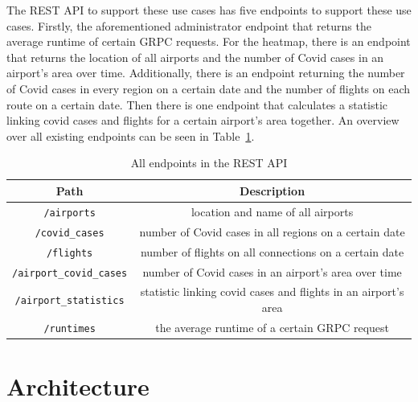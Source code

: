 \documentclass[11pt]{article}
\begin{document}
	The REST API to support these use cases has five endpoints to support these use cases. Firstly, the aforementioned administrator endpoint that returns the average runtime of certain GRPC requests. For the heatmap, there is an endpoint that returns the location of all airports and the number of Covid cases in an airport's area over time. Additionally, there is an endpoint returning the number of Covid cases in every region on a certain date and the number of flights on each route on a certain date. Then there is one endpoint that calculates a statistic linking covid cases and flights for a certain airport's area together. An overview over all existing endpoints can be seen in Table~\ref{tab:endpoints}.
	
	\begin{table}
	\begin{center}
	\begin{tabular}{|c|c|}
		\hline
		Path & Description \\
		\hline
		\texttt{/airports} & location and name of all airports \\
		\hline
		\texttt{/covid\_cases} & number of Covid cases in all regions on a certain date \\
		\hline
		\texttt{/flights} & number of flights on all connections on a certain date \\
		\hline
		\texttt{/airport\_covid\_cases} & number of Covid cases in an airport's area over time \\
		\hline
		\texttt{/airport\_statistics} & statistic linking covid cases and flights in an airport's area \\
		\hline
		\texttt{/runtimes} & the average runtime of a certain GRPC request \\
		\hline
	\end{tabular}
	\end{center}
	\caption{All endpoints in the REST API}
	\label{tab:endpoints}
	\end{table}


	\section{Architecture}
	
\end{document}
